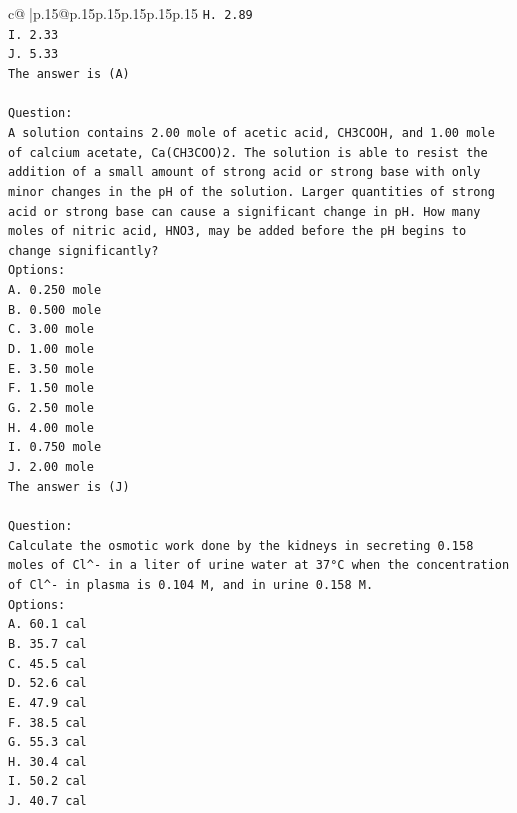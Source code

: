 \documentclass{article}
\begin{document}
{\begin{supertabular}{c@{$\;$}|p{.15\linewidth}@{}p{.15\linewidth}p{.15\linewidth}p{.15\linewidth}p{.15\linewidth}p{.15\linewidth}}
{{{\texttt{H. 2.89} \\
\texttt{I. 2.33} \\
\texttt{J. 5.33} \\
\texttt{The answer is (A)} \\
\\ 
\texttt{Question:} \\
\texttt{A solution contains 2.00 mole of acetic acid, CH3COOH, and 1.00 mole of calcium acetate, Ca(CH3COO)2. The solution is able to resist the addition of a small amount of strong acid or strong base with only minor changes in the pH of the solution. Larger quantities of strong acid or strong base can cause a significant change in pH. How many moles of nitric acid, HNO3, may be added before the pH begins to change significantly?} \\
\texttt{Options:} \\
\texttt{A. 0.250 mole} \\
\texttt{B. 0.500 mole} \\
\texttt{C. 3.00 mole} \\
\texttt{D. 1.00 mole} \\
\texttt{E. 3.50 mole} \\
\texttt{F. 1.50 mole} \\
\texttt{G. 2.50 mole} \\
\texttt{H. 4.00 mole} \\
\texttt{I. 0.750 mole} \\
\texttt{J. 2.00 mole} \\
\texttt{The answer is (J)} \\
\\ 
\texttt{Question:} \\
\texttt{Calculate the osmotic work done by the kidneys in secreting 0.158 moles of Cl\^{}{-} in a liter of urine water at 37°C when the concentration of Cl\^{}{-} in plasma is 0.104 M, and in urine 0.158 M.} \\
\texttt{Options:} \\
\texttt{A. 60.1 cal} \\
\texttt{B. 35.7 cal} \\
\texttt{C. 45.5 cal} \\
\texttt{D. 52.6 cal} \\
\texttt{E. 47.9 cal} \\
\texttt{F. 38.5 cal} \\
\texttt{G. 55.3 cal} \\
\texttt{H. 30.4 cal} \\
\texttt{I. 50.2 cal} \\
\texttt{J. 40.7 cal} \\
            }
        }
    }
     \\ \\


\end{supertabular}}
\end{document}
